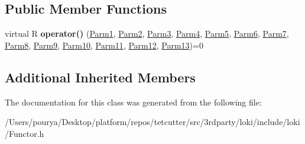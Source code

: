 \subsection*{Public Member Functions}
\begin{DoxyCompactItemize}
\item 
\hypertarget{classLoki_1_1FunctorImpl_3_01R_00_01_01_01_01_01_01_01_01_01_01_01_01_01_01_01_01_01_01_01_01_01a61bd4e4c12f56d6be0c2d19e011aa2f_af6c6a97544de3206b94163f9c43d798a}{}virtual R {\bfseries operator()} (\hyperlink{classLoki_1_1EmptyType}{Parm1}, \hyperlink{classLoki_1_1EmptyType}{Parm2}, \hyperlink{classLoki_1_1EmptyType}{Parm3}, \hyperlink{classLoki_1_1EmptyType}{Parm4}, \hyperlink{classLoki_1_1EmptyType}{Parm5}, \hyperlink{classLoki_1_1EmptyType}{Parm6}, \hyperlink{classLoki_1_1EmptyType}{Parm7}, \hyperlink{classLoki_1_1EmptyType}{Parm8}, \hyperlink{classLoki_1_1EmptyType}{Parm9}, \hyperlink{classLoki_1_1EmptyType}{Parm10}, \hyperlink{classLoki_1_1EmptyType}{Parm11}, \hyperlink{classLoki_1_1EmptyType}{Parm12}, \hyperlink{classLoki_1_1EmptyType}{Parm13})=0\label{classLoki_1_1FunctorImpl_3_01R_00_01_01_01_01_01_01_01_01_01_01_01_01_01_01_01_01_01_01_01_01_01a61bd4e4c12f56d6be0c2d19e011aa2f_af6c6a97544de3206b94163f9c43d798a}

\end{DoxyCompactItemize}
\subsection*{Additional Inherited Members}


The documentation for this class was generated from the following file\+:\begin{DoxyCompactItemize}
\item 
/\+Users/pourya/\+Desktop/platform/repos/tetcutter/src/3rdparty/loki/include/loki/Functor.\+h\end{DoxyCompactItemize}
